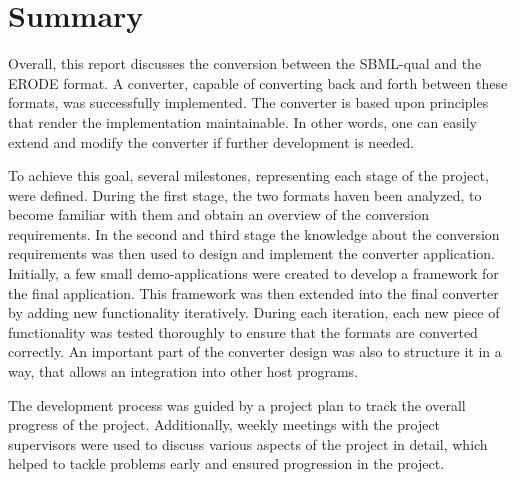 \chapter{Summary}
Overall, this report discusses the conversion between the SBML-qual and the ERODE format.  A converter, capable of converting back and forth between these formats, was successfully implemented.  The converter is based upon principles that render the implementation maintainable.  In other words,  one can easily extend and modify the converter if further development is needed.

To achieve this goal, several milestones, representing each stage of the project, were defined. During the first stage, the two formats haven been analyzed, to become familiar with them and obtain an overview of the conversion requirements. In the second and third stage the knowledge about the conversion requirements was then used to design and implement the converter application. Initially, a few small demo-applications were created to develop a framework for the final application. This framework was then extended into the final converter by adding new functionality iteratively. During each iteration, each new piece of functionality was tested thoroughly to ensure that the formats are converted correctly. An important part of the converter design was also to structure it in a way, that allows an integration into other host programs.

The development process was guided by a project plan to track the overall progress of the project. Additionally, weekly meetings with the project supervisors were used to discuss various aspects of the project in detail, which helped to tackle problems early and ensured progression in the project.